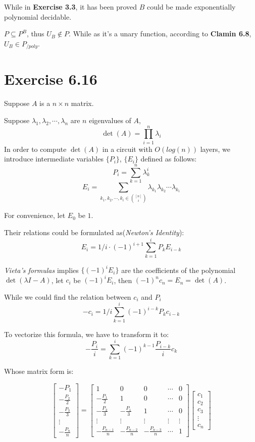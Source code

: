 \documentclass[paper=a4, fontsize=11pt]{scrartcl} %
\numberwithin{equation}{section} %
\numberwithin{figure}{section} %
\numberwithin{table}{section} %
\begin{document}
While in {\bf Exercise 3.3}, it has been proved $B$ could be made exponentially polynomial decidable.

$P \subseteq P^B$, thus $U_B \not\in P$. While as it's a unary function, according to {\bf Clamin 6.8}, $U_B \in P_{/poly}$.
\section*{Exercise 6.16}

Suppose $A$ is a $n\times n$ matrix. 

Suppose $\lambda_1, \lambda_2, \cdots, \lambda_n$ are $n$ eigenvalues of $A$, $$\det(A) = \prod_{i=1}^{n} \lambda_i$$
In order to compute $\det(A)$ in a circuit with $O(log(n))$ layers, we introduce intermediate variables $\{P_i\}$, $\{E_i\}$ defined as follows:
$$P_i = \sum_{k=1}^{n} \lambda_k^i$$
$$E_i = \sum_{k_1, k_2, \cdots,k_i \in {[n] \choose i}} \lambda_{k_1} \lambda_{k_2} \cdots \lambda_{k_i} $$

For convenience, let $E_0$ be $1$.

Their relations could be formulated as({\it Newton's Identity}):
$$E_i = 1/i \cdot (-1)^{i+1} \sum_{k=1}^{i} P_k E_{i - k}$$

{\it Vieta's formulas} implies $\{(-1)^{i} E_i\}$ are the coefficients of the polynomial $\det(\lambda I - A)$, let $c_i$ be $(-1)^{i} E_i$, then $(-1)^{n}c_n = E_n = \det(A)$.

While we could find the relation between $c_i$ and $P_i$
$$-c_i = 1/i \sum_{k=1}^{i} (-1)^{i - k}P_k c_{i-k}$$

To vectorize this formula, we have to transform it to:
$$-\frac{P_i}{i} = \sum_{k=1}^{i} (-1)^{k - 1}\frac{P_{i - k}}{i} 	c_{k}$$

Whose matrix form is:

$$
\begin{bmatrix} 
-P_1 \\
-\frac{P_2}{2} \\
-\frac{P_3}{3} \\ 
\vdots \\
-\frac{P_n}{n} 
\end{bmatrix} = 
\begin{bmatrix}
1 & 0 & 0 & \cdots & 0 \\
-\frac{P_1}{2} & 1 & 0 & \cdots & 0 \\
-\frac{P_2}{3} & -\frac{P_1}{3} & 1 & \cdots & 0 \\
\vdots & \vdots & \vdots & \vdots & \vdots \\
-\frac{P_{n-1}}{n} & -\frac{P_{n-2}}{n} & -\frac{P_{n-3}}{n} & \cdots & 1 
\end{bmatrix}
\begin{bmatrix}
c_1 \\
c_2 \\
c_3 \\
\vdots \\
c_n
\end{bmatrix}
$$
\end{document}
